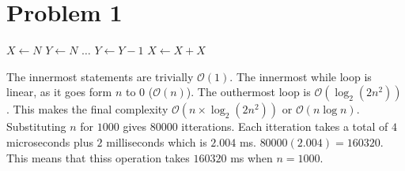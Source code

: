 \documentclass{article}
\newenvironment{problem}[1]{
  \nobreak\section*{Problem #1}
}{}
\begin{document}
  \begin{problem}{1}
    \begin{center}
      \begin{algorithmic}[1]
        \State $X \gets N$
        \Repeat
          \State $Y \gets N$
            \State $\dots$
            \State $Y \gets Y - 1$
          \EndWhile
          \State $X \gets X + X$
      \end{algorithmic}
    \end{center}
    The innermost statements are trivially $\mathcal{O}(1)$.  The innermost
    while loop is linear, as it goes form $n$ to $0$ ($\mathcal{O}(n)$).  The
    outhermost loop is $\mathcal{O}(\log_2(2n^2))$.  This makes the final
    complexity $\mathcal{O}(n \times \log_2(2n^2))$ or $\mathcal{O}(n\log{n})$.
    Substituting $n$ for $1000$ gives $80000$ itterations.  Each itteration takes
    a total of $4$ microseconds plus $2$ milliseconds which is $2.004$ ms.
    $80000(2.004)=160320$.  This means that thiss operation takes $160320$ ms
    when $n = 1000$.
  \end{problem}
\end{document}
